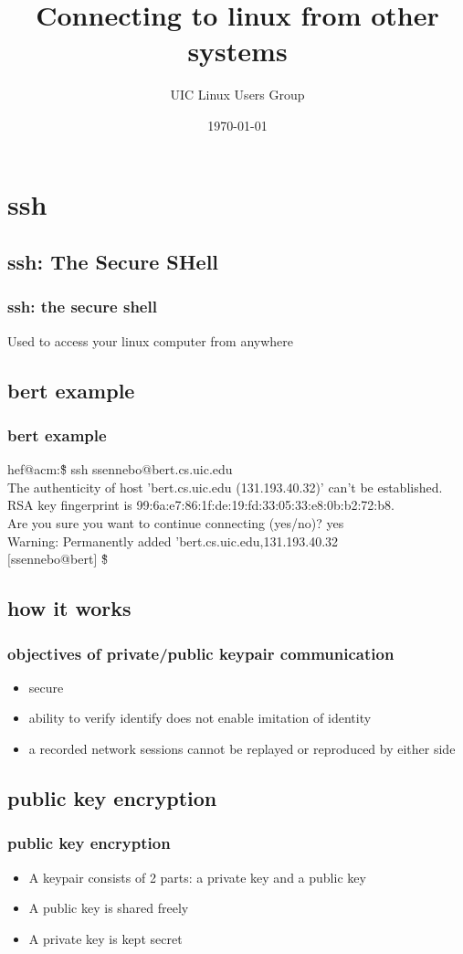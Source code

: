 \documentclass[hyperref={pdfpagelabels=false}]{beamer}
\title{Connecting to linux from other systems}
\author{UIC Linux Users Group}
\date{\today}
\begin{document}
\frame{\titlepage}
\section[outline]{}
\frame[allowframebreaks]{\tableofcontents}
\section{ssh}
\subsection{ssh: The Secure SHell}
\frame
{
  \frametitle{ssh: the secure shell}
  Used to access your linux computer from anywhere
}
\subsection{bert example}
\frame
{
  \frametitle{bert example}
  hef@acm:\~\$ ssh ssennebo@bert.cs.uic.edu\\
  The authenticity of host 'bert.cs.uic.edu (131.193.40.32)' can't be established.\\
  RSA key fingerprint is 99:6a:e7:86:1f:de:19:fd:33:05:33:e8:0b:b2:72:b8.\\
  Are you sure you want to continue connecting (yes/no)? yes\\
  Warning: Permanently added 'bert.cs.uic.edu,131.193.40.32\\
  $[$ssennebo@bert$]$ \~\$
}
\subsection{how it works}
\frame
{
  \frametitle{objectives of private/public keypair communication}
  \begin{itemize}
  \item{secure}
  \item{ability to verify identify does not enable imitation of identity}
  \item{a recorded network sessions cannot be replayed or reproduced by either side}
  \end{itemize}
}
\subsection{public key encryption}
\frame
{
    \frametitle{public key encryption}
    \begin{itemize}
    \item{A keypair consists of 2 parts: a private key and a public key}
    \item{A public key is shared freely}
    \item{A private key is kept secret}
    \end{itemize}
}
\end{document}
